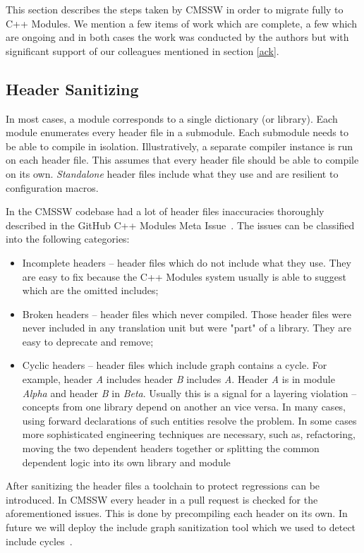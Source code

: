 \documentclass[12pt]{iopart}
\begin{document}
This section describes the steps taken by CMSSW in order to migrate fully to C++ Modules. We mention a few items of work which are complete, a few which are ongoing and in both cases the work was conducted by the authors but with significant support of our colleagues mentioned in section \ref{ack}.

\subsection{Header Sanitizing}
In most cases, a module corresponds to a single dictionary (or library). Each module enumerates every header file in a submodule. Each submodule needs to be able to compile in isolation. Illustratively, a separate compiler instance is run on each header file. This assumes that every header file should be able to compile on its own. \textit{Standalone} header files include what they use and are resilient to configuration macros.

In the CMSSW codebase had a lot of header files inaccuracies thoroughly described in the GitHub C++ Modules Meta Issue~\cite{Modules-gh-metaissue}. The issues can be classified into the following categories:
\begin{itemize}
    \item Incomplete headers -- header files which do not include what they use. They are easy to fix because the C++ Modules system usually is able to suggest which are the omitted includes;
    \item Broken headers -- header files which never compiled. Those header files were never included in any translation unit but were "part" of a library. They are easy to deprecate and remove;
    \item Cyclic headers -- header files which include graph contains a cycle. For example, header \textit{A} includes header \textit{B} includes \textit{A}. Header \textit{A} is in module \textit{Alpha} and header \textit{B} in \textit{Beta}. Usually this is a signal for a layering violation -- concepts from one library depend on another an vice versa. In many cases, using forward declarations of such entities resolve the problem. In some cases more sophisticated engineering techniques are necessary, such as, refactoring, moving the two dependent headers together or splitting the common dependent logic into its own library and module
\end{itemize}

After sanitizing the header files a toolchain to protect regressions can be introduced. In CMSSW every header in a pull request is checked for the aforementioned issues. This is done by precompiling each header on its own. In future we will deploy the include graph sanitization tool which we used to detect include cycles~\cite{scram-cycle-break}.
\end{document}

